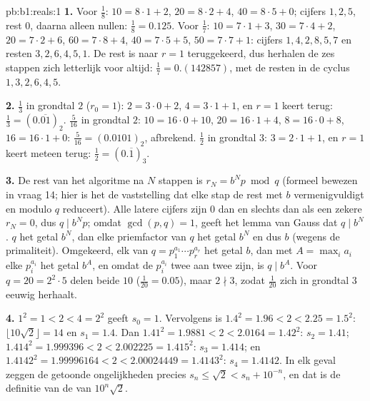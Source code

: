 \begin{solution}{pb:b1:reals:1}
\textbf{1.} Voor $\frac 18$: $10 = 8 \cdot 1 + 2$, $20 = 8 \cdot 2 + 4$,
$40 = 8 \cdot 5 + 0$; cijfers $1, 2, 5$, rest $0$, daarna alleen nullen:
$\frac 18 = 0.125$. Voor $\frac 17$: $10 = 7 \cdot 1 + 3$, $30 = 7 \cdot
4 + 2$, $20 = 7 \cdot 2 + 6$, $60 = 7 \cdot 8 + 4$, $40 = 7 \cdot 5 + 5$,
$50 = 7 \cdot 7 + 1$: cijfers $1, 4, 2, 8, 5, 7$ en resten $3, 2, 6, 4,
5, 1$. De rest is naar $r = 1$ teruggekeerd, dus herhalen de zes stappen
zich letterlijk voor altijd: $\frac 17 = 0.(142857)$, met de resten in de
cyclus $1, 3, 2, 6, 4, 5$.

\textbf{2.} $\frac 13$ in grondtal $2$ ($r_0 = 1$): $2 = 3 \cdot 0 + 2$,
$4 = 3 \cdot 1 + 1$, en $r = 1$ keert terug: $\frac 13 =
(0.\overline{01})_2$. $\frac{5}{16}$ in grondtal $2$: $10 = 16 \cdot 0 +
10$, $20 = 16 \cdot 1 + 4$, $8 = 16 \cdot 0 + 8$, $16 = 16 \cdot 1 + 0$:
$\frac{5}{16} = (0.0101)_2$, afbrekend. $\frac 12$ in grondtal $3$: $3 =
2 \cdot 1 + 1$, en $r = 1$ keert meteen terug: $\frac 12 =
(0.\overline{1})_3$.

\textbf{3.} De rest van het algoritme na $N$ stappen is $r_N = b^N p
\bmod q$ (formeel bewezen in vraag 14; hier is het de vaststelling dat
elke stap de rest met $b$ vermenigvuldigt en modulo $q$ reduceert). Alle
latere cijfers zijn $0$ dan en slechts dan als een zekere $r_N = 0$, dus
$q \mid b^N p$; omdat $\gcd(p, q) = 1$, geeft het lemma van Gauss dat $q
\mid b^N$.  $q$ het getal $b^N$, dan  elke priemfactor van $q$
het getal $b^N$ en dus $b$ (wegens de primaliteit). Omgekeerd,  elk
 van $q = p_1^{a_1} \cdots p_r^{a_r}$ het getal $b$, dan 
met $A = \max_i a_i$ elke $p_i^{a_i}$ het getal $b^A$, en omdat de
$p_i^{a_i}$ twee aan twee  zijn, is $q \mid b^A$. Voor $q =
20 = 2^2 \cdot 5$ delen beide  $10$ ($\frac{1}{20} = 0.05$),
maar $2 \nmid 3$, zodat $\frac{1}{20}$ zich in grondtal $3$ eeuwig
herhaalt.

\textbf{4.} $1^2 = 1 < 2 < 4 = 2^2$ geeft $s_0 = 1$. Vervolgens is
$1.4^2 = 1.96 < 2 < 2.25 = 1.5^2$: $\lfloor 10\sqrt 2 \rfloor = 14$ en
$s_1 = 1.4$. Dan $1.41^2 = 1.9881 < 2 < 2.0164 = 1.42^2$: $s_2 = 1.41$;
$1.414^2 = 1.999396 < 2 < 2.002225 = 1.415^2$: $s_3 = 1.414$; en
$1.4142^2 = 1.99996164 < 2 < 2.00024449 = 1.4143^2$: $s_4 = 1.4142$. In
elk geval zeggen de getoonde ongelijkheden precies $s_n \leq \sqrt 2 <
s_n + 10^{-n}$, en dat is de definitie van de  van $10^n \sqrt 2$.


\end{solution}
